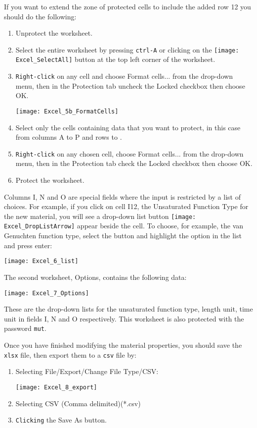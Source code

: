 If you want to extend the zone of protected cells to include the added row 12 you should do the following:
\begin{enumerate}
    \item Unprotect the worksheet.
    \item Select the entire worksheet by pressing {\tt ctrl-A} or clicking on the \texttt{[image: Excel\_SelectAll]} button at the top left corner of the worksheet.
    \item {\tt Right-click} on any cell and choose {\sf Format cells...} from the drop-down menu, then in the {\sf Protection} tab uncheck the {\sf Locked} checkbox then choose {\sf OK}.

        \texttt{[image: Excel\_5b\_FormatCells]}
    \item Select only the cells containing data that you want to protect, in this case from columns {\sf A} to {\sf P} and rows {} to {}.
    \item {\tt Right-click} on any chosen cell, choose {\sf Format cells...} from the drop-down menu, then  in the {\sf Protection} tab check the {\sf Locked} checkbox then choose {\sf OK}.
    \item Protect the worksheet.
\end{enumerate}

Columns {\sf I, N} and {\sf O} are special fields where the input is restricted by a list of choices.  For example, if you click on cell {\sf I12}, the {\sf Unsaturated Function Type} for the new material, you will see a drop-down list button \texttt{[image: Excel\_DropListArrow]} appear beside the cell.  To choose, for example, the {\sf van Genuchten} function type, select the button and highlight the option in the list and press enter:

   \texttt{[image: Excel\_6\_list]}

The second worksheet, {\sf Options}, contains the following data:

   \texttt{[image: Excel\_7\_Options]}

These are the drop-down lists for the unsaturated function type, length unit, time unit in fields I, N and O respectively.  This worksheet is also protected with the password {\tt mut}.

Once you have finished modifying the material properties, you should save the \texttt{xlsx} file, then export them to a \texttt{csv} file by:
\begin{enumerate}
    \item Selecting {\sf File/Export/Change File Type/CSV}:

   \texttt{[image: Excel\_8\_export]}

   \item  Selecting {\sf CSV (Comma delimited)(*.csv)}
   \item  {\tt Clicking} the {\sf Save As} button.
\end{enumerate}





